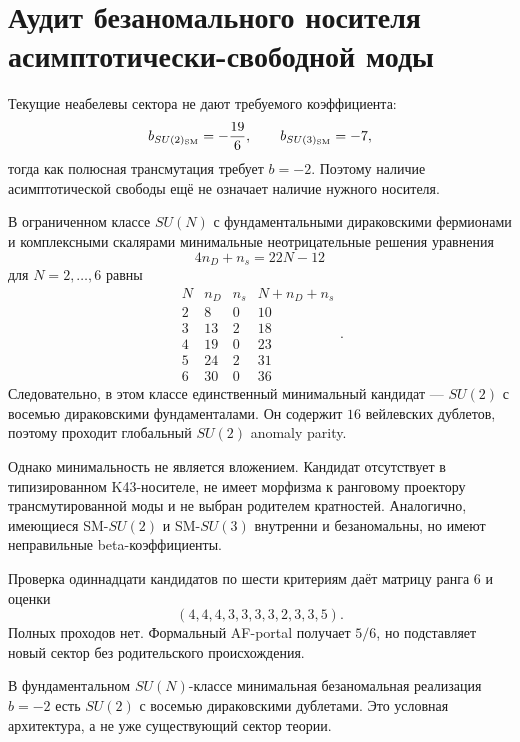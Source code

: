 \chapter{Аудит безаномального носителя асимптотически-свободной моды}
\label{ch:v10-discrete-resolution-af-carrier-audit}

Текущие неабелевы сектора не дают требуемого коэффициента:
\begin{equation}
 b_{SU(2)_{\rm SM}}=-\frac{19}{6},\qquad
 b_{SU(3)_{\rm SM}}=-7,
\end{equation}
тогда как полюсная трансмутация требует $b=-2$. Поэтому наличие
асимптотической свободы ещё не означает наличие нужного носителя.

В ограниченном классе $SU(N)$ с фундаментальными дираковскими фермионами
и комплексными скалярами минимальные неотрицательные решения уравнения
\begin{equation}
 4n_D+n_s=22N-12
\end{equation}
для $N=2,\ldots,6$ равны
\begin{equation}
 \begin{array}{c|cc|c}
 N&n_D&n_s&N+n_D+n_s\\\hline
 2&8&0&10\\3&13&2&18\\4&19&0&23\\5&24&2&31\\6&30&0&36
 \end{array}.
\end{equation}
Следовательно, в этом классе единственный минимальный кандидат ---
$SU(2)$ с восемью дираковскими фундаменталами. Он содержит $16$
вейлевских дублетов, поэтому проходит глобальный $SU(2)$ anomaly parity.

Однако минимальность не является вложением. Кандидат отсутствует в
типизированном K43-носителе, не имеет морфизма к ранговому проектору
трансмутированной моды и не выбран родителем кратностей. Аналогично,
имеющиеся SM-$SU(2)$ и SM-$SU(3)$ внутренни и безаномальны, но имеют
неправильные beta-коэффициенты.

Проверка одиннадцати кандидатов по шести критериям даёт матрицу ранга $6$
и оценки
\begin{equation}
 (4,4,4,3,3,3,3,2,3,3,5).
\end{equation}
Полных проходов нет. Формальный AF-portal получает $5/6$, но подставляет
новый сектор без родительского происхождения.

\begin{theorem}
В фундаментальном $SU(N)$-классе минимальная безаномальная реализация
$b=-2$ есть $SU(2)$ с восемью дираковскими дублетами. Это условная
архитектура, а не уже существующий сектор теории.
\end{theorem}

